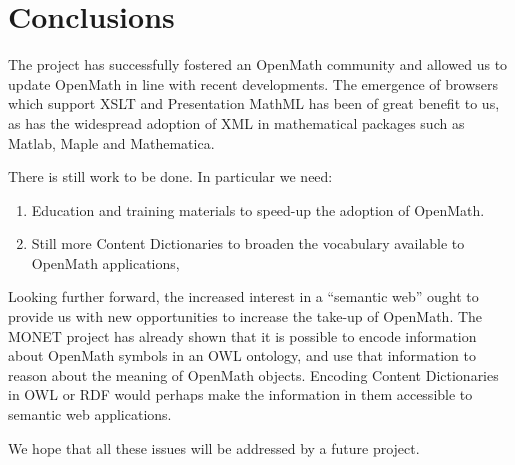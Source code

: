 \chapter{Conclusions}

The project has successfully fostered an OpenMath community and allowed
us to update OpenMath in line with recent developments.  The emergence
of browsers which support XSLT and Presentation MathML has been of great
benefit to us, as has the widespread adoption of XML in mathematical
packages such as Matlab, Maple and Mathematica.

There is still work to be done.  In particular we need:
\begin{enumerate}
\item Education and training materials to speed-up the adoption of
OpenMath.
\item Still more Content Dictionaries to broaden the vocabulary
available to OpenMath applications,
\end{enumerate}

Looking further forward, the increased interest in a ``semantic web''
ought to provide us with new opportunities to increase the take-up of
OpenMath.  The MONET project has already shown that it is possible to
encode information about OpenMath symbols in an OWL ontology, and use
that information to reason about the meaning of OpenMath objects.
Encoding Content Dictionaries in OWL or RDF would perhaps make the
information in them accessible to semantic web applications.    

We hope that all these issues will be addressed by a future project.
